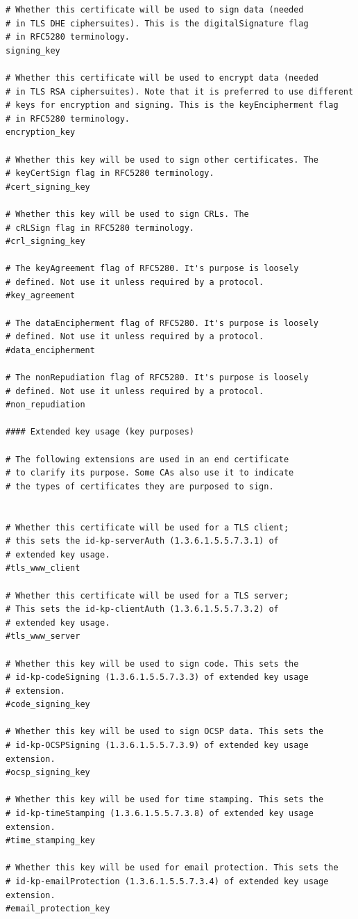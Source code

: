 \documentclass[10pt, a4paper]{report}
\begin{document}
\begin{verbatim}
# Whether this certificate will be used to sign data (needed
# in TLS DHE ciphersuites). This is the digitalSignature flag
# in RFC5280 terminology.
signing_key

# Whether this certificate will be used to encrypt data (needed
# in TLS RSA ciphersuites). Note that it is preferred to use different
# keys for encryption and signing. This is the keyEncipherment flag
# in RFC5280 terminology.
encryption_key

# Whether this key will be used to sign other certificates. The
# keyCertSign flag in RFC5280 terminology.
#cert_signing_key

# Whether this key will be used to sign CRLs. The
# cRLSign flag in RFC5280 terminology.
#crl_signing_key

# The keyAgreement flag of RFC5280. It's purpose is loosely
# defined. Not use it unless required by a protocol.
#key_agreement

# The dataEncipherment flag of RFC5280. It's purpose is loosely
# defined. Not use it unless required by a protocol.
#data_encipherment

# The nonRepudiation flag of RFC5280. It's purpose is loosely
# defined. Not use it unless required by a protocol.
#non_repudiation

#### Extended key usage (key purposes)

# The following extensions are used in an end certificate
# to clarify its purpose. Some CAs also use it to indicate
# the types of certificates they are purposed to sign.


# Whether this certificate will be used for a TLS client;
# this sets the id-kp-serverAuth (1.3.6.1.5.5.7.3.1) of 
# extended key usage.
#tls_www_client

# Whether this certificate will be used for a TLS server;
# This sets the id-kp-clientAuth (1.3.6.1.5.5.7.3.2) of 
# extended key usage.
#tls_www_server

# Whether this key will be used to sign code. This sets the
# id-kp-codeSigning (1.3.6.1.5.5.7.3.3) of extended key usage
# extension.
#code_signing_key

# Whether this key will be used to sign OCSP data. This sets the
# id-kp-OCSPSigning (1.3.6.1.5.5.7.3.9) of extended key usage extension.
#ocsp_signing_key

# Whether this key will be used for time stamping. This sets the
# id-kp-timeStamping (1.3.6.1.5.5.7.3.8) of extended key usage extension.
#time_stamping_key

# Whether this key will be used for email protection. This sets the
# id-kp-emailProtection (1.3.6.1.5.5.7.3.4) of extended key usage extension.
#email_protection_key


\end{verbatim}
\end{document}
